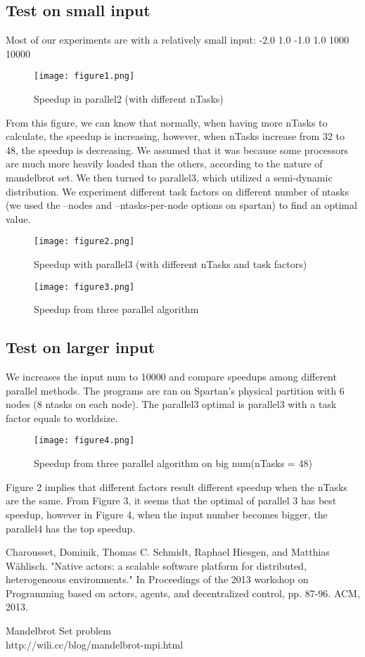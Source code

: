 \documentclass[a4paper]{article}
\begin{document}
\subsection{Test on small input}
Most of our experiments are with a relatively small input: -2.0 1.0 -1.0 1.0 1000 10000
\begin{figure}[H]
	\texttt{[image: figure1.png]}
	\caption{Speedup in parallel2 (with different nTasks)}
	\label{marker}
\end{figure}
From this figure, we can know that normally, when having more nTasks to calculate, the speedup is increasing, however, when nTasks increase from 32 to 48, the speedup is decreasing. We assumed that it was because some processors are much more heavily loaded than the others, according to the nature of mandelbrot set. We then turned to parallel3, which utilized a semi-dynamic distribution. We experiment different task factors on different number of ntasks (we used the --nodes and --ntasks-per-node options on spartan) to find an optimal value.
\begin{figure}[H]
	\texttt{[image: figure2.png]}
	\caption{Speedup with parallel3 (with different nTasks and task factors)}
	\label{marker}
\end{figure}

\begin{figure}[H]
	\texttt{[image: figure3.png]}
	\caption{Speedup from three parallel algorithm}
	\label{marker}
\end{figure}

\subsection{Test on larger input}
We increases the input num to 10000 and compare speedups among different parallel methods. The programs are ran on Spartan's physical partition with 6 nodes (8 ntasks on each node). The parallel3 optimal is parallel3 with a task factor equals to worldsize.
\begin{figure}[H]
	\texttt{[image: figure4.png]}
	\caption{Speedup from three parallel algorithm on big num(nTasks = 48)}
	\label{marker}
\end{figure}
\noindent Figure 2 implies that different factors result different speedup when the nTasks are the same. From Figure 3, it seems that the optimal of parallel 3 has best speedup, however in Figure 4, when the input number becomes bigger, the parallel4 has the top speedup.

\begin{thebibliography}{9}
Charousset, Dominik, Thomas C. Schmidt, Raphael Hiesgen, and Matthias Wählisch. "Native actors: a scalable software platform for distributed, heterogeneous environments." In Proceedings of the 2013 workshop on Programming based on actors, agents, and decentralized control, pp. 87-96. ACM, 2013.

Mandelbrot Set problem\\
http://wili.cc/blog/mandelbrot-mpi.html
\end{thebibliography}
\end{document}

